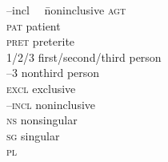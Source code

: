 \documentclass[output=paper,
modfonts
]{LSP/langsci}
\begin{document}
\begin{tabbing}
–incl~~ \= noninclusive\kill
\textsc{agt} \> \\
\textsc{pat} \> patient\\
\textsc{pret} \> preterite\\
1/2/3 \> first/second/third person\\
–3 \> nonthird person\\
\textsc{excl} \> exclusive\\
\textsc{–incl} \> noninclusive\\
\textsc{ns} \> nonsingular\\
\textsc{sg} \> singular\\
\textsc{pl} \> 
\end{tabbing}

\printbibliography[heading=subbibliography,notkeyword=this]
\end{document}
